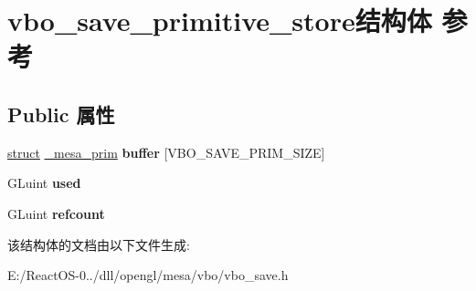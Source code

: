 \hypertarget{structvbo__save__primitive__store}{}\section{vbo\+\_\+save\+\_\+primitive\+\_\+store结构体 参考}
\label{structvbo__save__primitive__store}
\subsection*{Public 属性}
\begin{DoxyCompactItemize}
\item 
\mbox{\label{structvbo__save__primitive__store_a7df07cf8f435c5432b89936e9f2234bb}} 
\hyperlink{interfacestruct}{struct} \hyperlink{struct__mesa__prim}{\+\_\+mesa\+\_\+prim} {\bfseries buffer} \mbox{[}V\+B\+O\+\_\+\+S\+A\+V\+E\+\_\+\+P\+R\+I\+M\+\_\+\+S\+I\+ZE\mbox{]}
\item 
\mbox{\label{structvbo__save__primitive__store_acb337bc5bdc864383514434ee04039c5}} 
G\+Luint {\bfseries used}
\item 
\mbox{\label{structvbo__save__primitive__store_a89ac665ec0db677721d1bf3d7300d4a0}} 
G\+Luint {\bfseries refcount}
\end{DoxyCompactItemize}


该结构体的文档由以下文件生成\+:\begin{DoxyCompactItemize}
\item 
E\+:/\+React\+O\+S-\/0../dll/opengl/mesa/vbo/vbo\+\_\+save.\+h\end{DoxyCompactItemize}

